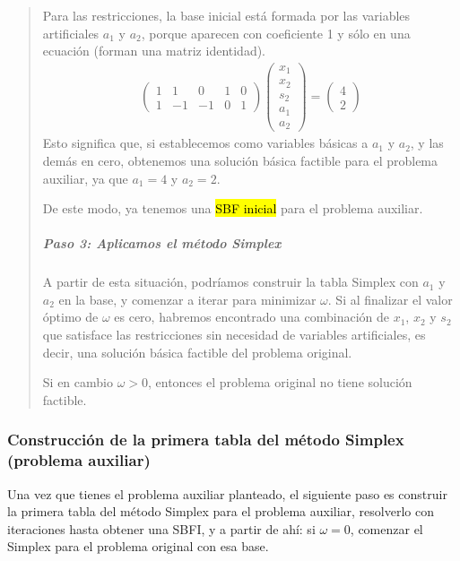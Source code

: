 \begin{quote}
  Para las restricciones, la base inicial está formada por las variables artificiales \(a_1\) y \(a_2\), porque aparecen con coeficiente 1 y sólo en una ecuación (forman una matriz identidad).
  \begin{align*}
    \begin{pmatrix}
      1 & 1 & 0 & 1 & 0\\
      1 & -1 & -1 & 0 & 1
    \end{pmatrix}
    \begin{pmatrix}
      x_1\\
      x_2\\
      s_2\\
      a_1\\
      a_2
    \end{pmatrix}
    =
    \begin{pmatrix}
      4\\
      2
    \end{pmatrix}
  \end{align*}
  Esto significa que, si establecemos como variables básicas a \(a_1\) y \(a_2\), y las demás en cero, obtenemos una solución básica factible para el problema auxiliar, ya que \(a_1 = 4\) y \(a_2 = 2\).

  De este modo, ya tenemos una \hl{SBF inicial} para el problema auxiliar.
  
  \subparagraph{Paso 3: Aplicamos el método Simplex}
  
  A partir de esta situación, podríamos construir la tabla Simplex con \(a_1\) y \(a_2\) en la base, y comenzar a iterar para minimizar \(\omega\). Si al finalizar el valor óptimo de \(\omega\) es cero, habremos encontrado una combinación de \(x_1\), \(x_2\) y \(s_2\) que satisface las restricciones sin necesidad de variables artificiales, es decir, una solución básica factible del problema original.
  
  Si en cambio \(\omega > 0\), entonces el problema original no tiene solución factible.  
\end{quote}

\subsubsection{Construcción de la primera tabla del método Simplex (problema auxiliar)}

Una vez que tienes el problema auxiliar planteado, el siguiente paso es construir la primera tabla del método Simplex para el problema auxiliar, resolverlo con iteraciones hasta obtener una SBFI, y a partir de ahí: si \(\omega = 0\), comenzar el Simplex para el problema original con esa base.

